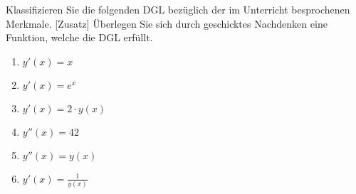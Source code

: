 \item Klassifizieren Sie die folgenden DGL bezüglich der im Unterricht besprochenen Merkmale. [Zusatz] Überlegen Sie sich durch geschicktes Nachdenken eine Funktion, welche die DGL erfüllt.

\begin{multicols}{3}
\begin{enumerate}
\item $y'(x) = x$
\item $y'(x) =  e^x$
\item $y'(x)= 2\cdot y(x)$
\item $y''(x) = 42$
\item $ y''(x) = y(x)$
\item $y'(x) = \frac{1}{y(x)}$
\end{enumerate}
\end{multicols}

